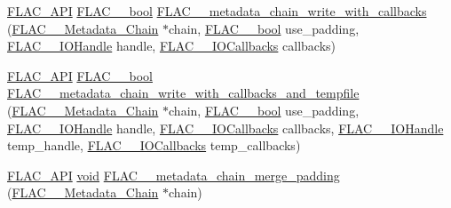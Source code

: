 \begin{DoxyCompactItemize}
\item 
\mbox{\hyperlink{group__flac__export_ga56ca07df8a23310707732b1c0007d6f5}{F\+L\+A\+C\+\_\+\+A\+PI}} \mbox{\hyperlink{ordinals_8h_a95103469f1cbd78b8cf250194985b34e}{F\+L\+A\+C\+\_\+\+\_\+bool}} \mbox{\hyperlink{group__flac__metadata__level2_ga6bf7552940ec2242718d1ab164b89e03}{F\+L\+A\+C\+\_\+\+\_\+metadata\+\_\+chain\+\_\+write\+\_\+with\+\_\+callbacks}} (\mbox{\hyperlink{group__flac__metadata__level2_gaec6993c60b88f222a52af86f8f47bfdf}{F\+L\+A\+C\+\_\+\+\_\+\+Metadata\+\_\+\+Chain}} $\ast$chain, \mbox{\hyperlink{ordinals_8h_a95103469f1cbd78b8cf250194985b34e}{F\+L\+A\+C\+\_\+\+\_\+bool}} use\+\_\+padding, \mbox{\hyperlink{group__flac__callbacks_ga4c329c3168dee6e352384c5e9306260d}{F\+L\+A\+C\+\_\+\+\_\+\+I\+O\+Handle}} handle, \mbox{\hyperlink{struct_f_l_a_c_____i_o_callbacks}{F\+L\+A\+C\+\_\+\+\_\+\+I\+O\+Callbacks}} callbacks)
\item 
\mbox{\hyperlink{group__flac__export_ga56ca07df8a23310707732b1c0007d6f5}{F\+L\+A\+C\+\_\+\+A\+PI}} \mbox{\hyperlink{ordinals_8h_a95103469f1cbd78b8cf250194985b34e}{F\+L\+A\+C\+\_\+\+\_\+bool}} \mbox{\hyperlink{group__flac__metadata__level2_ga371beab0d09d5248272bcb8d57de94f3}{F\+L\+A\+C\+\_\+\+\_\+metadata\+\_\+chain\+\_\+write\+\_\+with\+\_\+callbacks\+\_\+and\+\_\+tempfile}} (\mbox{\hyperlink{group__flac__metadata__level2_gaec6993c60b88f222a52af86f8f47bfdf}{F\+L\+A\+C\+\_\+\+\_\+\+Metadata\+\_\+\+Chain}} $\ast$chain, \mbox{\hyperlink{ordinals_8h_a95103469f1cbd78b8cf250194985b34e}{F\+L\+A\+C\+\_\+\+\_\+bool}} use\+\_\+padding, \mbox{\hyperlink{group__flac__callbacks_ga4c329c3168dee6e352384c5e9306260d}{F\+L\+A\+C\+\_\+\+\_\+\+I\+O\+Handle}} handle, \mbox{\hyperlink{struct_f_l_a_c_____i_o_callbacks}{F\+L\+A\+C\+\_\+\+\_\+\+I\+O\+Callbacks}} callbacks, \mbox{\hyperlink{group__flac__callbacks_ga4c329c3168dee6e352384c5e9306260d}{F\+L\+A\+C\+\_\+\+\_\+\+I\+O\+Handle}} temp\+\_\+handle, \mbox{\hyperlink{struct_f_l_a_c_____i_o_callbacks}{F\+L\+A\+C\+\_\+\+\_\+\+I\+O\+Callbacks}} temp\+\_\+callbacks)
\item 
\mbox{\hyperlink{group__flac__export_ga56ca07df8a23310707732b1c0007d6f5}{F\+L\+A\+C\+\_\+\+A\+PI}} \mbox{\hyperlink{_s_d_l__opengles2__gl2ext_8h_ae5d8fa23ad07c48bb609509eae494c95}{void}} \mbox{\hyperlink{group__flac__metadata__level2_gab24934bc1f0e054c631a22c9b9221f3e}{F\+L\+A\+C\+\_\+\+\_\+metadata\+\_\+chain\+\_\+merge\+\_\+padding}} (\mbox{\hyperlink{group__flac__metadata__level2_gaec6993c60b88f222a52af86f8f47bfdf}{F\+L\+A\+C\+\_\+\+\_\+\+Metadata\+\_\+\+Chain}} $\ast$chain)
\item 

\end{DoxyCompactItemize}
